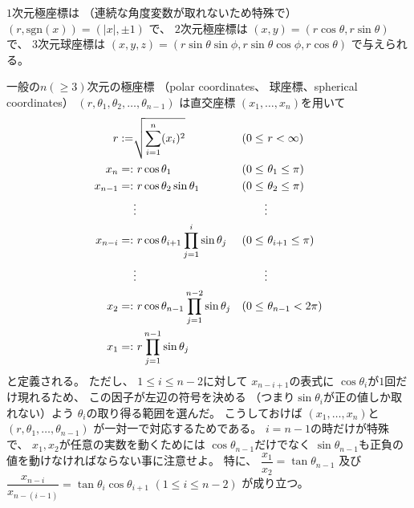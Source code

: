 $1$次元極座標は
（連続な角度変数が取れないため特殊で）
$(r, \mathrm{sgn}(x)) = (|x|, \pm 1)$
で、
$2$次元極座標は
$(x, y) = (r \cos \theta, r \sin \theta)$
で、
$3$次元球座標は
$(x, y, z)
=
    (r \sin \theta \sin \phi,
    r \sin \theta \cos \phi,
    r \cos \theta)$
で与えられる。

一般の$n (\ge 3)$次元の極座標
（polar coordinates、
球座標、spherical coordinates）
$(r, \theta_1, \theta_2,
\dots, \theta_{n-1})$
は直交座標
$(x_1, \dots, x_n)$を用いて
\begin{subequations}
\begin{align}
    r :=& \sqrt{
        \sum_{i=1}^n
        (x_i)^2
    }
&
    (0 \le\ &r < \infty)
\\
    x_n
    =:&\ 
    r \cos \theta_1
&
    (0 \le\ &\theta_1 \le \pi)
\\
    x_{n-1}
    =:&\ 
    r \cos \theta_2
    \sin \theta_1
&
    (0 \le\ &\theta_2 \le \pi)
\\\notag
    &
    \vdots
    &
    \vdots
\\
    x_{n-i}
    =:&\ 
    r
    \cos \theta_{i+1}
    \prod_{j=1}^{i}
    \sin \theta_j
&
    (0 \le\ &\theta_{i+1} \le \pi)
\\\notag
    &
    \vdots
    &
    \vdots
\\
    x_{2}
    =:&\ 
    r
    \cos \theta_{n-1}
    \prod_{j=1}^{n-2}
    \sin \theta_j
&
    (0 \le\ &\theta_{n-1} < 2 \pi)
\\
    x_{1}
    =:&\ 
    r
    \prod_{j=1}^{n-1}
    \sin \theta_j
\end{align}
\label{n dimensional spherical coordinates}
\end{subequations}
と定義される。
ただし、
$1 \le i \le n-2$に対して
$x_{n-i+1}$の表式に
$\cos \theta_i$が$1$回だけ現れるため、
この因子が左辺の符号を決める
（つまり$\sin \theta_i$が正の値しか取れない）よう
$\theta_i$の取り得る範囲を選んだ。
こうしておけば
$(x_1, \dots, x_n)$と
$(r, \theta_1, \dots, \theta_{n-1})$
が一対一で対応するためである。
$i = n - 1$の時だけが特殊で、
$x_1, x_2$が任意の実数を動くためには
$\cos \theta_{n-1}$だけでなく
$\sin \theta_{n-1}$も正負の値を動けなければならない事に注意せよ。
特に、
$\dfrac
    { x_{1} }
    { x_{2} }
=
    \tan \theta_{n-1}
$
及び
$
\dfrac
    { x_{n - i} }
    { x_{n - (i - 1)} }
=
    \tan \theta_{i}
    \cos \theta_{i+1}
$
$(1 \le i \le n - 2)$
が成り立つ。

